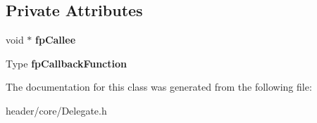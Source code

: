 \subsection*{Private Attributes}
\begin{DoxyCompactItemize}
\item 
\mbox{\label{class_delegate_ac006440f17274562043965efe6d3132c}} 
void $\ast$ {\bfseries fp\+Callee}
\item 
\mbox{\label{class_delegate_a8c788b809ab07fd5791d8b42d0a24d7c}} 
Type {\bfseries fp\+Callback\+Function}
\end{DoxyCompactItemize}


The documentation for this class was generated from the following file\+:\begin{DoxyCompactItemize}
\item 
header/core/Delegate.\+h\end{DoxyCompactItemize}
